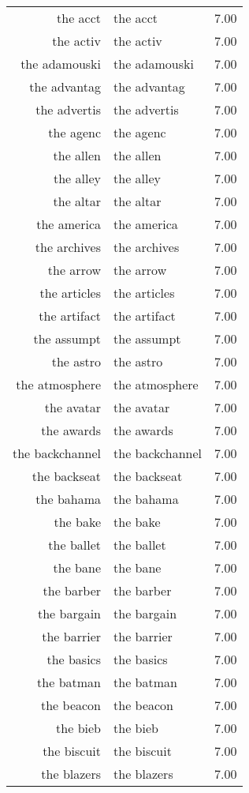 \begin{table}[ht]
\begin{tabular}{rlr}
  the acct & the acct & 7.00 \\ 
  the activ & the activ & 7.00 \\ 
  the adamouski & the adamouski & 7.00 \\ 
  the advantag & the advantag & 7.00 \\ 
  the advertis & the advertis & 7.00 \\ 
  the agenc & the agenc & 7.00 \\ 
  the allen & the allen & 7.00 \\ 
  the alley & the alley & 7.00 \\ 
  the altar & the altar & 7.00 \\ 
  the america & the america & 7.00 \\ 
  the archives & the archives & 7.00 \\ 
  the arrow & the arrow & 7.00 \\ 
  the articles & the articles & 7.00 \\ 
  the artifact & the artifact & 7.00 \\ 
  the assumpt & the assumpt & 7.00 \\ 
  the astro & the astro & 7.00 \\ 
  the atmosphere & the atmosphere & 7.00 \\ 
  the avatar & the avatar & 7.00 \\ 
  the awards & the awards & 7.00 \\ 
  the backchannel & the backchannel & 7.00 \\ 
  the backseat & the backseat & 7.00 \\ 
  the bahama & the bahama & 7.00 \\ 
  the bake & the bake & 7.00 \\ 
  the ballet & the ballet & 7.00 \\ 
  the bane & the bane & 7.00 \\ 
  the barber & the barber & 7.00 \\ 
  the bargain & the bargain & 7.00 \\ 
  the barrier & the barrier & 7.00 \\ 
  the basics & the basics & 7.00 \\ 
  the batman & the batman & 7.00 \\ 
  the beacon & the beacon & 7.00 \\ 
  the bieb & the bieb & 7.00 \\ 
  the biscuit & the biscuit & 7.00 \\ 
  the blazers & the blazers & 7.00 \\ 

\end{tabular}
\end{table}
